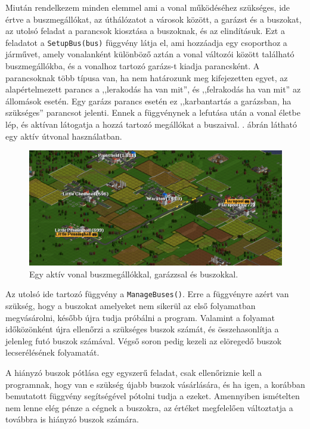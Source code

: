 Miután rendelkezem minden elemmel ami a vonal működéséhez szükséges, ide értve a buszmegállókat, az úthálózatot a városok között, a garázst és a buszokat, az utolsó feladat a parancsok kiosztása a buszoknak, és az elindításuk. Ezt a feladatot a \texttt{SetupBus(bus)} függvény látja el, ami hozzáadja egy csoporthoz a járművet, amely vonalanként különböző aztán a vonal változói között található buszmegállókba, és a vonalhoz tartozó garázs-t kiadja parancsként. A parancsoknak több típusa van, ha nem határozunk meg kifejezetten egyet, az alapértelmezett parancs a ,,lerakodás ha van mit'', és ,,felrakodás ha van mit'' az állomások esetén. Egy garázs parancs esetén ez ,,karbantartás a garázsban, ha szükséges'' parancsot jelenti. Ennek a függvénynek a lefutása után a vonal életbe lép, és aktívan látogatja a hozzá tartozó megállókat a buszaival. . ábrán látható egy aktív útvonal használatban.

\begin{figure}
	\centering
	\includegraphics[width=\textwidth]{images/vonal.png}
	\caption{Egy aktív vonal buszmegállókkal, garázzsal és buszokkal.}
	\label{fig:vonal}
\end{figure}

Az utolsó ide tartozó függvény a \texttt{ManageBuses()}. Erre a függvényre azért van szükség, hogy a buszokat amelyeket nem sikerül az első folyamatban megvásárolni, később újra tudja próbálni a program. Valamint a folyamat időközönként újra ellenőrzi a szükséges buszok számát, és összehasonlítja a jelenleg futó buszok számával. Végső soron pedig kezeli az elöregedő buszok lecserélésének folyamatát.

A hiányzó buszok pótlása egy egyszerű feladat, csak ellenőriznie kell a programnak, hogy van e szükség újabb buszok vásárlására, és ha igen, a korábban bemutatott függvény segítségével pótolni tudja a ezeket. Amennyiben ismételten nem lenne elég pénze a cégnek a buszokra, az értéket megfelelően változtatja a továbbra is hiányzó buszok számára.

